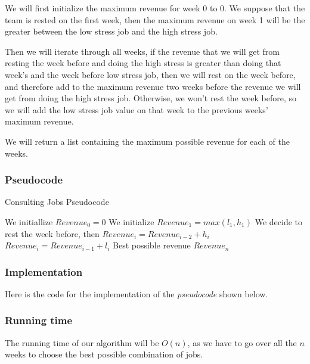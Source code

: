 \documentclass{article}
\begin{document}
We will first initialize the maximum revenue for week 0 to 0. We suppose that the team is rested on the first week, then the maximum revenue on week 1 will be the greater between the low stress job and the high stress job.

Then we will iterate through all weeks, if the revenue that we will get from resting the week before and doing the high stress is greater than doing that week's and the week before low stress job, then we will rest on the week before, and therefore add to the maximum revenue two weeks before the revenue we will get from doing the high stress job. Otherwise, we won't rest the week before, so we will add the low stress job value on that week to the previous weeks' maximum revenue.

We will return a list containing the maximum possible revenue for each of the weeks.

\subsubsection*{Pseudocode}

\begin{algorithm}[H]
\caption{Consulting Jobs Pseudocode}
\begin{algorithmic}[1]
\State We initiallize $Revenue_0 = 0$
\State We initialize $Revenue_1 = max(l_1,h_1)$
  \State We decide to rest the week before, then
  \State $Revenue_i = Revenue_{i-2}+h_i$
 \Else
  \State $Revenue_i = Revenue_{i-1}+l_i$
 \EndIf
\EndFor
\State \Return Best possible revenue $Revenue_n$
\end{algorithmic}
\end{algorithm}

\subsubsection*{Implementation}

Here is the code for the implementation of the \textit{pseudocode} shown below.



\subsubsection*{Running time}

The running time of our algorithm will be $O(n)$, as we have to go over all the $n$ weeks to choose the best possible combination of jobs.
\end{document}
